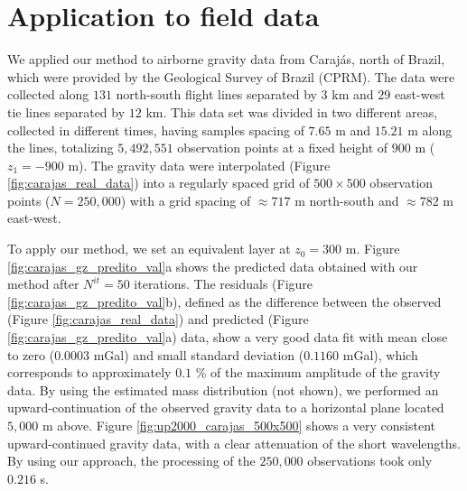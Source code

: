 \section{Application to field data}

We applied our method to airborne gravity data from Caraj{\'a}s, north of Brazil, which were provided by 
the Geological Survey of Brazil (CPRM). The data were collected along $131$ north-south flight lines separated 
by $3$ km and $29$ east-west tie lines separated by $12$ km.
This data set was divided in two different areas, collected in different times, having samples spacing of 
$7.65$ m and $15.21$ m along the lines, totalizing  $5,492,551$ observation points at a fixed height 
of $900$ m ($z_{1} = -900$ m). 
The gravity data were interpolated (Figure \ref{fig:carajas_real_data}) into a regularly spaced grid of 
$500 \times 500$ observation points ($N = 250,000$) with a grid spacing of 
$\approx 717$ m north-south and $\approx 782$ m east-west.

To apply our method, we set an equivalent layer at $z_{0} = 300$ m. 
Figure \ref{fig:carajas_gz_predito_val}a shows the predicted data obtained with our method after 
$N^{it} = 50$ iterations.
The residuals (Figure \ref{fig:carajas_gz_predito_val}b), defined as the difference between the observed 
(Figure \ref{fig:carajas_real_data}) and predicted (Figure \ref{fig:carajas_gz_predito_val}a) data, show a 
very good data fit with mean close to zero ($0.0003$ mGal) and small standard deviation ($0.1160$ mGal), 
which corresponds to approximately $0.1$ \% of the maximum amplitude of the gravity data.
By using the estimated mass distribution (not shown), we performed an upward-continuation of the 
observed gravity data to a horizontal plane located $5,000$ m above. Figure \ref{fig:up2000_carajas_500x500} 
shows a very consistent upward-continued gravity data, with a clear attenuation of the short 
wavelengths. By using our approach, the processing of the $250,000$ observations took only 
$0.216$ s.